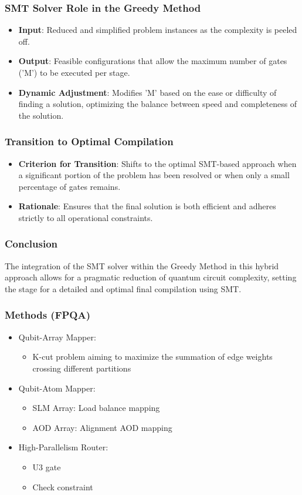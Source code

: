 \documentclass[18 pt]{beamer}
\begin{document}
\begin{frame}
    \frametitle{SMT Solver Role in the Greedy Method}
    \begin{itemize}
        \item \textbf{Input}: Reduced and simplified problem instances as the complexity is peeled off.
        \item \textbf{Output}: Feasible configurations that allow the maximum number of gates ('M') to be executed per stage.
        \item \textbf{Dynamic Adjustment}: Modifies 'M' based on the ease or difficulty of finding a solution, optimizing the balance between speed and completeness of the solution.
    \end{itemize}
\end{frame}

\begin{frame}
    \frametitle{Transition to Optimal Compilation}
    \begin{itemize}
        \item \textbf{Criterion for Transition}: Shifts to the optimal SMT-based approach when a significant portion of the problem has been resolved or when only a small percentage of gates remains.
        \item \textbf{Rationale}: Ensures that the final solution is both efficient and adheres strictly to all operational constraints.
    \end{itemize}
\end{frame}

\begin{frame}
    \frametitle{Conclusion}
    The integration of the SMT solver within the Greedy Method in this hybrid approach allows for a pragmatic reduction of quantum circuit complexity, setting the stage for a detailed and optimal final compilation using SMT.
\end{frame}

\begin{frame}
    \frametitle{Methods (FPQA)}
    \begin{itemize}
        \item Qubit-Array Mapper:
        \begin{itemize}
            \item K-cut problem aiming to maximize the summation of edge weights crossing different partitions
        \end{itemize}
        \item Qubit-Atom Mapper:
        \begin{itemize}
            \item SLM Array: Load balance mapping
            \item AOD Array: Alignment AOD mapping
        \end{itemize}
        \item High-Parallelism Router:
        \begin{itemize}
            \item U3 gate
            \item Check constraint
        \end{itemize}
    \end{itemize}
\end{frame}
\end{document}
